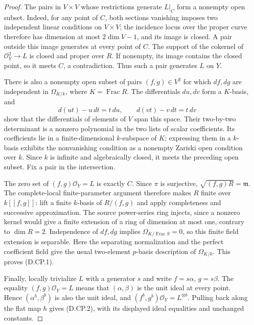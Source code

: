 \begin{proof}
The pairs in $V\times V$ whose restrictions generate $L|_C$
form a nonempty open subset. Indeed, for any point of $C$, both
sections vanishing imposes two independent linear conditions
on $V\times V$; the incidence locus over the proper curve
therefore has dimension at most $2\dim V-1$, and its image
is closed. A pair outside this image generates at every point
of $C$. The support of the cokernel of
$\mathcal O_Y^2\to L$ is closed and proper over $R$.
If nonempty, its image contains the closed point, so it meets
$C$, a contradiction. Thus such a pair generates $L$ on $Y$.

There is also a nonempty open subset of pairs $(f,g)\in V^2$
for which $df,dg$ are independent in $\Omega_{K/k}$,
where $K=\operatorname{Frac}R$. The differentials $du,dv$
form a $K$-basis, and
\[
       d(ut)-u\,dt=t\,du,\qquad
       d(vt)-v\,dt=t\,dv
\]
show that the differentials of elements of $V$ span this space.
Their two-by-two determinant is a nonzero polynomial in the
two lists of scalar coefficients. Its coefficients lie in a
finite-dimensional $k$-subspace of $K$; expressing them in a
$k$-basis exhibits the nonvanishing condition as a nonempty
Zariski open condition over $k$. Since $k$ is infinite and
algebraically closed, it meets the preceding open subset.
Fix a pair in the intersection.

The zero set of $(f,g)\mathcal O_Y=L$ is exactly $C$.
Since $\pi$ is surjective, $\sqrt{(f,g)R}=\mathfrak m$.
The complete-local finite-parameter argument therefore makes
$R$ finite over $k[[f,g]]$: lift a finite $k$-basis of
$R/(f,g)$ and apply completeness and successive approximation.
The source power-series ring injects, since a nonzero kernel
would give a finite extension of a ring of dimension at most
one, contrary to $\dim R=2$.
Independence of $df,dg$ implies
$\Omega_{K/\operatorname{Frac}S}=0$, so this finite field
extension is separable. Here the separating normalization and
the perfect coefficient field give the usual two-element
$p$-basis description of $\Omega_{K/k}$.
This proves (D.CP.1).

Finally, locally trivialize $L$ with a generator $s$ and write
$f=s\alpha$, $g=s\beta$. The equality $(f,g)\mathcal O_Y=L$
means that $(\alpha,\beta)$ is the unit ideal at every point.
Hence $(\alpha^b,\beta^b)$ is also the unit ideal, and
$(f^b,g^b)\mathcal O_Y=L^{\otimes b}$.
Pulling back along the flat map $h$ gives (D.CP.2), with its
displayed ideal equalities and unchanged constants.
\end{proof}

